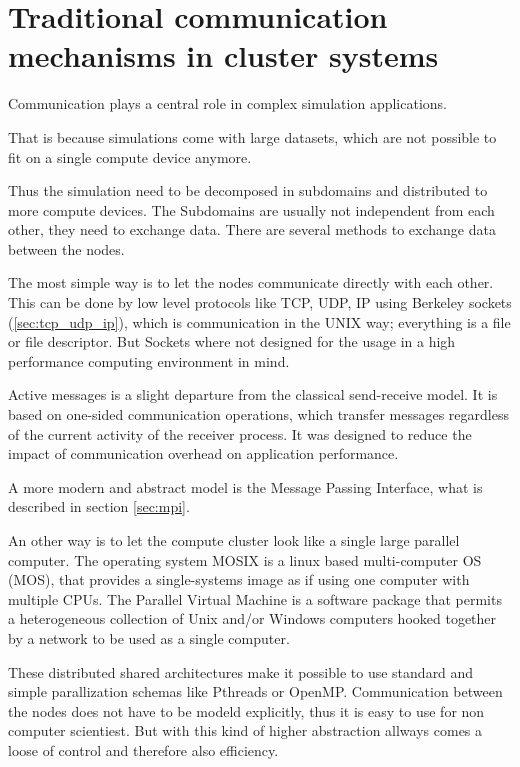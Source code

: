 \section{Traditional communication mechanisms in cluster systems}
\label{sec:communication}
Communication plays a central role in complex simulation
applications.

That is because simulations come with large datasets, which
are not possible to fit on a single compute device anymore.

 Thus the simulation need to be decomposed in
subdomains and distributed to more compute devices.  The Subdomains
are usually not independent from each other, they need to exchange
data. There are several methods to exchange data between the nodes.

The most simple way is to let the nodes communicate directly with each
other.  This can be done by low level protocols like TCP, UDP, IP
using Berkeley sockets (\ref{sec:tcp_udp_ip}), which is communication
in the UNIX way; everything is a file or file descriptor. But Sockets
where not designed for the usage in a high performance computing
environment in mind.

Active messages \cite{ref:am} is a slight departure from the classical
send-receive model. It is based on one-sided communication operations,
which transfer messages regardless of the current activity of the
receiver process. It was designed to reduce the impact of
communication overhead on application performance.

A more modern and abstract model is the Message Passing Interface,
what is described in section \ref{sec:mpi}.

An other way is to let the compute cluster look like a single large
parallel computer. The operating system MOSIX \cite{ref:mosix} is a
linux based multi-computer OS (MOS), that provides a single-systems
image\cite{ref:single_system_image} as if using one computer with
multiple CPUs. The Parallel Virtual Machine\cite{ref:pvm} is a
software package that permits a heterogeneous collection of Unix
and/or Windows computers hooked together by a network to be used as a
single computer.

These distributed shared architectures make it possible to use
standard and simple parallization schemas like Pthreads or OpenMP.
Communication between the nodes does not have to be modeld explicitly,
thus it is easy to use for non computer scientiest. But with this kind
of higher abstraction allways comes a loose of control and therefore
also efficiency.

